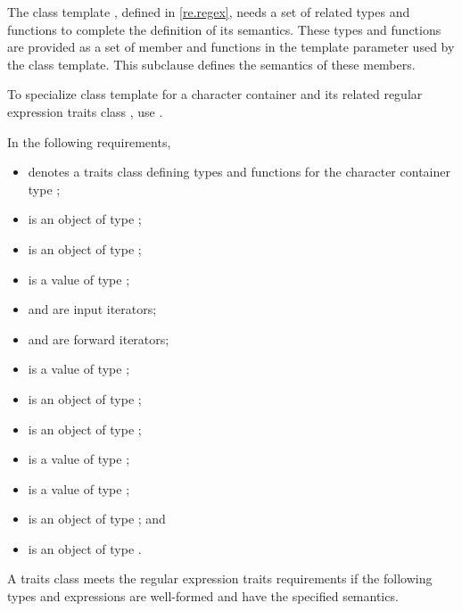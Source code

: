 \pnum
The class template , defined in
\ref{re.regex}, needs a set of related types and
functions to complete the definition of its semantics. These types
and functions are provided as a set of member  and functions
in the template parameter  used by the  class
template. This subclause defines the semantics of these
members.

\pnum
To specialize class template  for a character
container  and its related regular
expression traits class , use .

\pnum
{}%
%
%
%
In the following requirements,
\begin{itemize}
\item
{} denotes a traits class defining types and functions
for the character container type ;
\item
{} is an object of type ;
\item
{} is an object of type ;
\item
{} is a value of type ;
\item
{} and  are input iterators;
\item
{} and  are forward iterators;
\item
{} is a value of type ;
\item
{} is an object of type ;
\item
{} is an object of type ;
\item
{} is a value of  type ;
\item
{} is a value of type ;
\item
{} is an object of type ; and
\item
{} is an object of type .
\end{itemize}

\pnum
A traits class  meets the regular expression traits requirements
if the following types and expressions are well-formed and have the specified
semantics.


